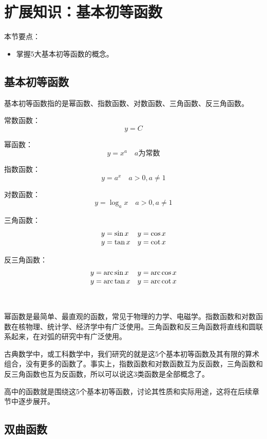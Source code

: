 \section{扩展知识：基本初等函数}

本节要点：
\begin{itemize}
    \item 掌握5大基本初等函数的概念。
\end{itemize}

\subsection{基本初等函数}

基本初等函数指的是幂函数、指数函数、对数函数、三角函数、反三角函数。

常数函数：
\[
y=C
\]

幂函数：
\[
y=x^a\quad a\text{为常数}
\]

指数函数：
\[
y=a^x\quad a>0,a\ne 1
\]

对数函数：
\[
y=\log _ax\quad a>0,a\ne 1
\]

三角函数：
\[
\begin{matrix}
	y=\sin x \hfill & y=\cos x \hfill \\
	y=\tan x \hfill & y=\cot x \hfill \\
\end{matrix}
\]

反三角函数：
\[
\begin{matrix}
	y=\mathrm{arc}\sin x \hfill & y=\mathrm{arc}\cos x \hfill \\
	y=\mathrm{arc}\tan x \hfill & y=\mathrm{arc}\cot x \hfill \\
\end{matrix}
\]

~

幂函数是最简单、最直观的函数，常见于物理的力学、电磁学。指数函数和对数函数在核物理、统计学、经济学中有广泛使用。三角函数和反三角函数将直线和圆联系起来，在对弧的研究中有广泛使用。

古典数学中，或工科数学中，我们研究的就是这5个基本初等函数及其有限的算术组合，没有更多的函数了。事实上，指数函数和对数函数互为反函数，三角函数和反三角函数也互为反函数，所以可以说这3类函数是全部概念了。

高中的函数就是围绕这5个基本初等函数，讨论其性质和实际用途，这将在后续章节中逐步展开。

\subsection{双曲函数}

